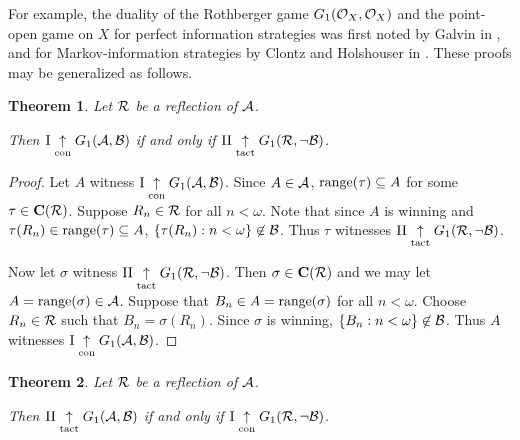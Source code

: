 \documentclass{amsart}
\theoremstyle{plain}
\newtheorem{theorem}{Theorem}
\theoremstyle{definition}
\theoremstyle{remark}
\theoremstyle{plain}
\theoremstyle{definition}
\theoremstyle{remark}
\begin{document}
For example,
the duality of the Rothberger game \(G_{1}(\mathcal{O}_X,\mathcal{O}_X)\)
and the point-open game on \(X\) for perfect information strategies
was first noted by Galvin in \cite{MR0493925}, and
for Markov-information strategies by Clontz and Holshouser in
\cite{CLONTZ2019106815}. These proofs may be generalized as follows.

\begin{theorem}
  Let \(\mathcal{R}\) be a reflection of \(\mathcal{A}\). 

  Then
  \(\mathrm{I}\underset{\text{con}}{\uparrow}G_{1}(\mathcal{A},\mathcal{B})\) if and only if
  \(\mathrm{II}\underset{\text{tact}}{\uparrow}G_{1}(\mathcal{R},\neg\mathcal{B})\).
\end{theorem}

\begin{proof}
  Let \(A\) witness 
  \(\mathrm{I}\underset{\text{con}}{\uparrow}G_{1}(\mathcal{A},\mathcal{B})\).
  Since \(A\in\mathcal{A}\),
  \(\text{range}(\tau)\subseteq A\)
  for some \(\tau\in\mathbf C(\mathcal{R})\). 
  Suppose \(R_n\in \mathcal{R}\) for all \(n<\omega\).
  Note that since \(A\) is winning and 
  \(\tau(R_n)\in\text{range}(\tau)\subseteq A\),
  \(\{\tau(R_n):n<\omega\}\not\in\mathcal{B}\). Thus \(\tau\) witnesses
  \(\mathrm{II}\underset{\text{tact}}{\uparrow}G_{1}(\mathcal{R},\neg\mathcal{B})\).

  Now let \(\sigma\) witness
  \(\mathrm{II}\underset{\text{tact}}{\uparrow}G_{1}(\mathcal{R},\neg\mathcal{B})\).
  Then \(\sigma\in\mathbf C(\mathcal{R})\) and we may let
  \(A=\text{range}(\sigma)\in\mathcal{A}\). 
  Suppose that \(B_n\in A=\text{range}(\sigma)\) for
  all \(n<\omega\). Choose \(R_n\in\mathcal{R}\) such that 
  \(B_n=\sigma(R_n)\). Since \(\sigma\) is winning,
  \(\{B_n:n<\omega\}\not\in\mathcal{B}\). Thus \(A\) witnesses
  \(\mathrm{I}\underset{\text{con}}{\uparrow}G_{1}(\mathcal{A},\mathcal{B})\).
\end{proof}

\begin{theorem}
  Let \(\mathcal{R}\) be a reflection of \(\mathcal{A}\). 

  Then
  \(\mathrm{II}\underset{\text{tact}}{\uparrow}G_{1}(\mathcal{A},\mathcal{B})\) if and only if
  \(\mathrm{I}\underset{\text{con}}{\uparrow}G_{1}(\mathcal{R},\neg\mathcal{B})\).
\end{theorem}
\end{document}
